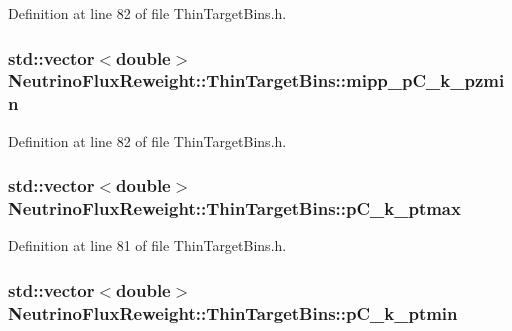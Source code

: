 Definition at line 82 of file Thin\-Target\-Bins.\-h.

\hypertarget{class_neutrino_flux_reweight_1_1_thin_target_bins_a4b235f101eb246b1c539fe8d7f14a7bb}{
\subsubsection[{mipp\-\_\-p\-C\-\_\-k\-\_\-pzmin}]{\setlength{\rightskip}{0pt plus 5cm}std\-::vector$<$double$>$ Neutrino\-Flux\-Reweight\-::\-Thin\-Target\-Bins\-::mipp\-\_\-p\-C\-\_\-k\-\_\-pzmin}}\label{class_neutrino_flux_reweight_1_1_thin_target_bins_a4b235f101eb246b1c539fe8d7f14a7bb}


Definition at line 82 of file Thin\-Target\-Bins.\-h.

\hypertarget{class_neutrino_flux_reweight_1_1_thin_target_bins_ade2dd6b6ee73ad9b8437e539164f84f4}{
\subsubsection[{p\-C\-\_\-k\-\_\-ptmax}]{\setlength{\rightskip}{0pt plus 5cm}std\-::vector$<$double$>$ Neutrino\-Flux\-Reweight\-::\-Thin\-Target\-Bins\-::p\-C\-\_\-k\-\_\-ptmax}}\label{class_neutrino_flux_reweight_1_1_thin_target_bins_ade2dd6b6ee73ad9b8437e539164f84f4}


Definition at line 81 of file Thin\-Target\-Bins.\-h.

\hypertarget{class_neutrino_flux_reweight_1_1_thin_target_bins_a33433920d029d7f1fd1de56f4b0e672e}{
\subsubsection[{p\-C\-\_\-k\-\_\-ptmin}]{\setlength{\rightskip}{0pt plus 5cm}std\-::vector$<$double$>$ Neutrino\-Flux\-Reweight\-::\-Thin\-Target\-Bins\-::p\-C\-\_\-k\-\_\-ptmin}}\label{class_neutrino_flux_reweight_1_1_thin_target_bins_a33433920d029d7f1fd1de56f4b0e672e}


